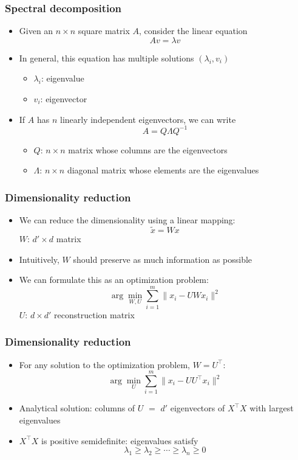 \documentclass[10pt]{beamer}
\begin{document}
\begin{frame}
  \frametitle{Spectral decomposition}
  \begin{itemize}
	\item Given an $n\times n$ square matrix $A$, consider the linear equation
	\[Av = \lambda v\]
	\vspace*{-0.5cm}
	\pause
	\item In general, this equation has {\color{red} multiple solutions} $(\lambda_i,v_i)$
	\begin{itemize}
	\item $\lambda_i$: {\color{red} eigenvalue}
	\item $v_i$: {\color{red} eigenvector}
	\end{itemize}
	\pause
	\item If $A$ has $n$ {\color{red} linearly independent} eigenvectors, we can write
	\[A = Q \Lambda Q^{-1}\]
	\vspace*{-0.5cm}
	\begin{itemize}
	\item $Q$: $n\times n$ matrix whose columns are the eigenvectors
	\item $\Lambda$: $n\times n$ diagonal matrix whose elements are the eigenvalues
	\end{itemize}
  \end{itemize}
\end{frame}

\begin{frame}
  \frametitle{Dimensionality reduction}
  \begin{itemize}
	\item We can reduce the dimensionality using a {\color{red} linear} mapping:
	\[\tilde{x} = Wx\]
	$W$: $d'\times d$ matrix
	\pause
	\item Intuitively, $W$ should preserve as much information as possible
	\item We can formulate this as an optimization problem:
	\[\arg\min_{W,U} \sum_{i=1}^m \lVert x_i - UWx_i\rVert^2\]
	$U$: $d\times d'$ {\color{red} reconstruction matrix}
  \end{itemize}
\end{frame}

\begin{frame}
  \frametitle{Dimensionality reduction}
  \begin{itemize}
	\item For any solution to the optimization problem, $W=U^\top$:
	\[\arg\min_U \sum_{i=1}^m \lVert x_i - UU^\top x_i\rVert^2\]
	\pause
	\item {\color{red} Analytical solution}: columns of $U$ $=$ $d'$ eigenvectors of $X^\top X$ with largest eigenvalues
	\item $X^\top X$ is {\color{red} positive semidefinite}: eigenvalues satisfy
	\[\lambda_1 \geq \lambda_2 \geq \cdots \geq \lambda_n \geq 0\]
  \end{itemize}
\end{frame}
\end{document}
